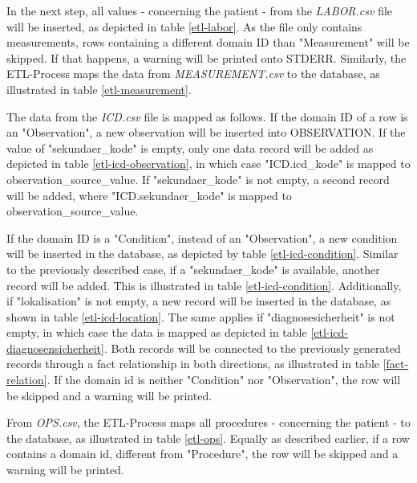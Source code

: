 In the next step, all values - concerning the patient - from the \textit{LABOR.csv} file will be inserted, as depicted in table \ref{etl-labor}.
As the file only contains measurements, rows containing a different domain ID than "Measurement" will be skipped. 
If that happens, a warning will be printed onto STDERR. 
Similarly, the ETL-Process maps the data from \textit{MEASUREMENT.csv} to the database, as illustrated in table \ref{etl-measurement}.

The data from the \textit{ICD.csv} file is mapped as follows. If the domain ID of a row is an "Observation", a new observation will be inserted into OBSERVATION. 
If the value of "sekundaer\_kode" is empty, only one data record will be added as depicted in table \ref{etl-icd-observation}, in which case "ICD.icd\_kode" is mapped to observation\_source\_value.
If "sekundaer\_kode" is not empty, a second record will be added, where "ICD.sekundaer\_kode" is mapped to observation\_source\_value.

If the domain ID is a "Condition", instead of an "Observation", a new condition will be inserted in the database, as depicted by table \ref{etl-icd-condition}.
Similar to the previously described case, if a "sekundaer\_kode" is available, another record will be added. This is illustrated in table \ref{etl-icd-condition}. 
Additionally, if "lokalisation" is not empty, a new record will be inserted in the database, as shown in table \ref{etl-icd-location}.
The same applies if "diagnosesicherheit" is not empty, in which case the data is mapped as depicted in table \ref{etl-icd-diagnosensicherheit}.
Both records will be connected to the previously generated records through a fact relationship in both directions, as illustrated in table \ref{fact-relation}. 
If the domain id is neither "Condition" nor "Observation", the row will be skipped and a warning will be printed.

From \textit{OPS.csv}, the ETL-Process maps all procedures - concerning the patient - to the database, as illustrated in table \ref{etl-ops}.
Equally as described earlier, if a row contains a domain id, different from "Procedure", the row will be skipped and a warning will be printed.

